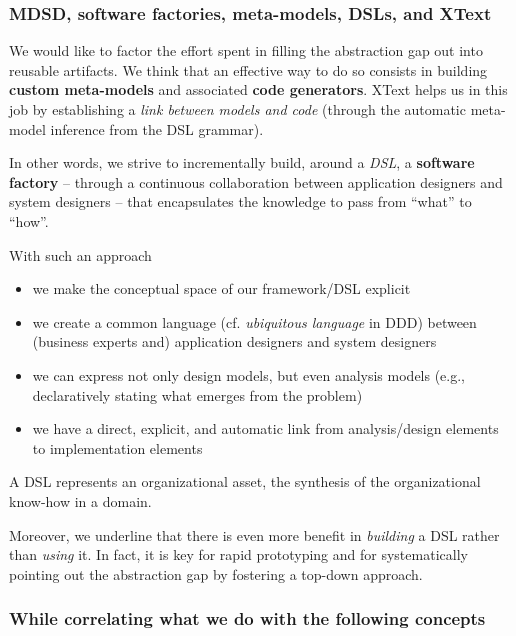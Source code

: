 \documentclass[11pt]{article}
\begin{document}
\subsubsection*{MDSD, software factories, meta-models, DSLs, and XText}

We would like to factor the effort spent in filling the abstraction gap out into
 reusable artifacts. 
We think that an effective way to do so consists in building \textbf{custom
 meta-models} and associated \textbf{code generators}.
XText helps us in this job by establishing a \emph{link between models and
code} (through the automatic meta-model inference from the DSL grammar).

In other words, we strive to incrementally build, around a \emph{DSL}, a
\textbf{software factory} -- through a continuous collaboration between application
designers and system designers -- that encapsulates the knowledge to pass from ``what'' to ``how''.

With such an approach
\begin{itemize}
  \item we make the conceptual space of our framework/DSL explicit
  \item we create a common language (cf. \emph{ubiquitous language} in DDD)
  between (business experts and) application designers and system designers
  \item we can express not only design models, but
  even analysis models (e.g., declaratively stating what emerges from the
  problem)
\item we have a direct, explicit, and
  automatic link from analysis/design elements to implementation elements
\end{itemize}

A DSL represents an organizational asset, the
synthesis of the organizational know-how in a domain.

Moreover, we underline that there is even more benefit in \emph{building} a DSL
rather than \emph{using} it. In fact, it is key for rapid prototyping and for
systematically pointing out the abstraction gap by fostering a top-down
approach.


\subsubsection*{While correlating what we do with the following concepts}
\end{document}
